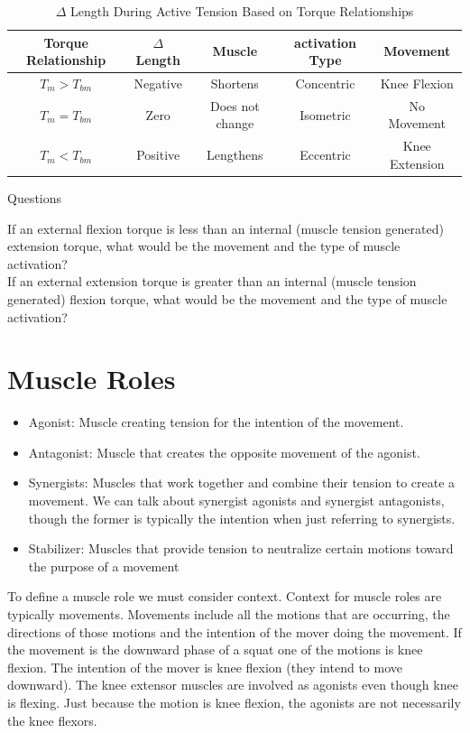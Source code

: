 \begin{table}[h!]
\centering
\begin{tabular}{||c c c c c||} 
 \hline
 Torque Relationship & $\Delta$ Length & Muscle & activation Type & Movement\\ [0.5ex] 
 \hline\hline
$T_m > T_{bm}$ & Negative & Shortens & Concentric & Knee Flexion \\
$T_m = T_{bm}$ & Zero & Does not change & Isometric & No Movement\\[1ex] 
$T_m < T_{bm}$ & Positive & Lengthens & Eccentric & Knee Extension \\[1ex] 
 \hline
\end{tabular}
\caption{$\Delta$ Length During Active Tension Based on Torque Relationships}
\label{table:NHE}
\end{table}

\begin{question}{Questions}
\begin{flushleft}  
If an external flexion torque is less than an internal (muscle tension generated) extension torque, what would be the movement and the type of muscle activation? \\
If an external extension torque is greater than an internal (muscle tension generated) flexion torque, what would be the movement and the type of muscle activation?
\end{flushleft}
\end{question}

\section{Muscle Roles}

\begin{itemize}
\item Agonist: Muscle creating tension for the intention of the movement.
\item Antagonist: Muscle that creates the opposite movement of the agonist.
\item Synergists: Muscles that work together and combine their tension to create a movement. We can talk about synergist agonists and synergist antagonists, though the former is typically the intention when just referring to synergists.
\item Stabilizer: Muscles that provide tension to neutralize certain motions toward the purpose of a movement
\end{itemize}

To define a muscle role we must consider context. Context for muscle roles are typically movements. Movements include all the motions that are occurring, the directions of those motions and the intention of the mover doing the movement. If the movement is the downward phase of a squat one of the motions is knee flexion. The intention of the mover is knee flexion (they intend to move downward). The knee extensor muscles are involved as agonists even though knee is flexing. Just because the motion is knee flexion, the agonists are not necessarily the knee flexors.


